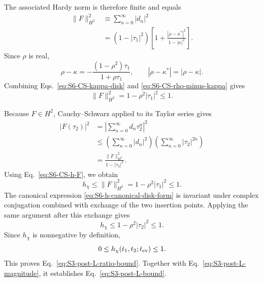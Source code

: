 \documentclass[11pt,a4paper]{article}
\begin{document}
The associated Hardy norm is therefore finite and equals
\begin{equation}
\begin{aligned}
\|F\|_{H^2}^2
&\equiv
\sum_{n=0}^{\infty}|d_n|^2
\\
&=
(1-|\tau_1|^2)
\left[
1+
\frac{
|\rho-\kappa^*|^2
}{
1-|\kappa|^2
}
\right].
\end{aligned}
\label{eq:S6-CS-Hardy-norm}
\end{equation}
Since \(\rho\) is real,
\begin{equation}
\rho-\kappa
=
-\frac{
(1-\rho^2)\tau_1
}{
1+\rho\tau_1
},
\qquad
|\rho-\kappa^*|
=
|\rho-\kappa|.
\label{eq:S6-CS-rho-minus-kappa}
\end{equation}
Combining Eqs.~\eqref{eq:S6-CS-kappa-disk} and
\eqref{eq:S6-CS-rho-minus-kappa} gives
\begin{equation}
\|F\|_{H^2}^2
=
1-\rho^2|\tau_1|^2
\leq1 .
\label{eq:S6-CS-Hardy-norm-final}
\end{equation}

Because \(F\in H^2\), Cauchy--Schwarz applied to its Taylor series gives
\begin{equation}
\begin{aligned}
|F(\tau_2)|^2
&=
\left|
\sum_{n=0}^{\infty}
d_n\tau_2^n
\right|^2
\\
&\leq
\left(
\sum_{n=0}^{\infty}|d_n|^2
\right)
\left(
\sum_{n=0}^{\infty}|\tau_2|^{2n}
\right)
\\
&=
\frac{
\|F\|_{H^2}^2
}{
1-|\tau_2|^2
}.
\end{aligned}
\label{eq:S6-CS-evaluation}
\end{equation}
Using Eq.~\eqref{eq:S6-CS-h-F}, we obtain
\begin{equation}
h_\chi
\leq
\|F\|_{H^2}^2
=
1-\rho^2|\tau_1|^2
\leq1 .
\label{eq:S6-CS-first-bound}
\end{equation}
The canonical expression
\eqref{eq:S6-h-canonical-disk-form} is invariant under complex conjugation
combined with exchange of the two insertion points. Applying the same
argument after this exchange gives
\begin{equation}
h_\chi
\leq
1-\rho^2|\tau_2|^2
\leq1 .
\label{eq:S6-CS-second-bound}
\end{equation}
Since \(h_\chi\) is nonnegative by definition,
\begin{equation}
0
\leq
h_\chi(t_1,t_2;t_{\rm ev})
\leq
1 .
\label{eq:S6-h-bound}
\end{equation}
This proves Eq.~\eqref{eq:S3-post-L-ratio-bound}. Together with
Eq.~\eqref{eq:S3-post-L-magnitude}, it establishes
Eq.~\eqref{eq:S3-post-L-bound}.
\end{document}
